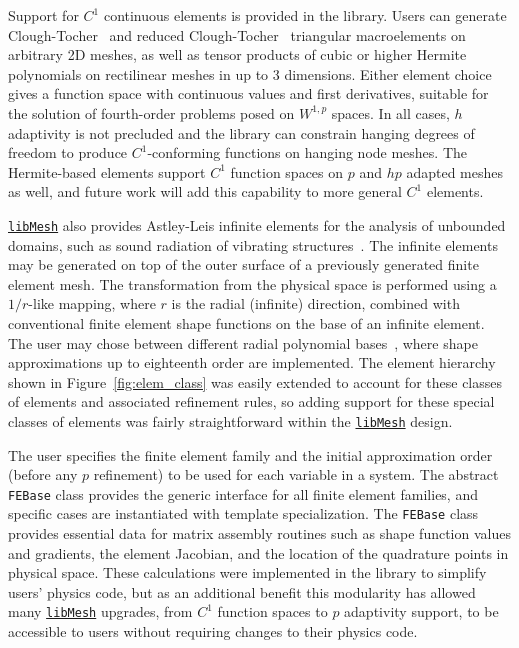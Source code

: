 \documentclass[global,twocolumn,final]{svjour}
\newcommand{\libMesh}{\href{http://libmesh.sourceforge.net}{\texttt{lib\-Mesh}}}
\begin{document}

Support for $C^1$ continuous elements is provided in the library.
Users can generate Clough-Tocher~\cite{CloughTocher} and reduced 
Clough-Tocher~\cite{Cia78} triangular
macroelements on arbitrary 2D meshes, as well as tensor products of
cubic or higher Hermite polynomials on rectilinear meshes in up to 3
dimensions.  Either element choice gives a function space with
continuous values
and first derivatives, suitable for the solution of fourth-order
problems posed on $W^{1,p}$ spaces.  In all cases, $h$ adaptivity is not
precluded and the library can constrain hanging degrees of freedom to
produce $C^1$-conforming functions on hanging node meshes.  The
Hermite-based elements support $C^1$ function spaces on $p$ and $hp$
adapted meshes as well, and future work will add this capability to
more general $C^1$ elements.

\libMesh{} also provides Astley-Leis infinite elements for the
analysis of unbounded domains, such as sound radiation of vibrating
structures~\cite{DreyD06}.  The infinite elements may be generated on
top of the outer surface of a previously generated finite element
mesh. The transformation from the physical space is performed using a
$1/r$-like mapping, where $r$ is the radial (infinite) direction,
combined with conventional finite element shape functions on the base
of an infinite element. The user may chose between different radial
polynomial bases~\cite{Dreyer-2003}, where shape approximations up to
eighteenth order are implemented.  The element hierarchy shown in
Figure~\ref{fig:elem_class} was easily extended to account for these
classes of elements and associated refinement rules, so adding support
for these special classes of elements was fairly straightforward
within the \libMesh{} design.

The user specifies the finite element family and the initial
approximation order (before any $p$ refinement)
to be used for each variable in a system.  The abstract \texttt{FEBase}
class provides the generic interface for all finite element families, and
specific cases are instantiated with template specialization.  The
\texttt{FEBase} class provides essential data for matrix assembly
routines such as shape function values and gradients, the element
Jacobian, and the location of the quadrature points in physical space.
These calculations were implemented in the library to simplify users'
physics code, but as an additional benefit this modularity has allowed
many \libMesh{} upgrades, from $C^1$ function spaces to $p$
adaptivity support, to be accessible to users without requiring
changes to their physics code.
\end{document}
